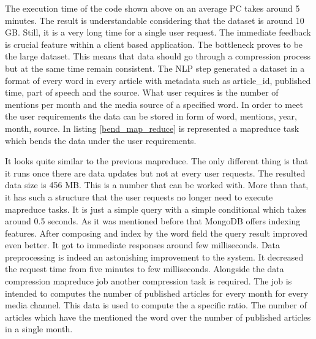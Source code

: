 

The execution time of the code shown above on an average PC takes around 5 minutes. The result is understandable considering that the dataset is around 10 GB. Still, it is a very long time for a single user request. The immediate feedback is crucial feature within a client based application. The bottleneck proves to be the large dataset. This means that data should go through a compression process but at the same time remain consistent. The NLP step generated a dataset in a format of every word in every article with metadata such as article\_id, published time, part of speech and the source. What user requires is the number of mentions per month and the media source of a specified word. In order to meet the user requirements the data can be stored in form of  {word, mentions, year, month, source}. In listing \ref{bend_map_reduce} is represented a mapreduce task which bends the data under the user requirements.



It looks quite similar to the previous mapreduce. The only different thing is that it runs once there are data updates but not at every user requests. The resulted data size is 456 MB. This is a number that can be worked with. More than that, it has such a structure that the user requests no longer need to execute mapreduce tasks. It is just a simple query with a simple conditional which takes around 0.5 seconds. As it was mentioned before that MongoDB offers indexing features. After composing and index by the word field the query result improved even better. It got to immediate responses around few milliseconds. Data preprocessing is indeed an astonishing improvement to the system. It decreased the request time from five minutes to few milliseconds. Alongside the data compression mapreduce job another compression task is required. The job is intended to computes the number of published articles for every month for every media channel. This data is used to compute the a specific ratio. The number of articles which have the mentioned the word over the number of published articles in a single month.

